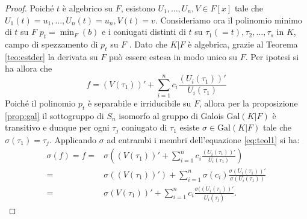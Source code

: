 \documentclass[10pt,oneside]{article}
\theoremstyle{definition}
\theoremstyle{plain}
\theoremstyle{definition}
\theoremstyle{plain}
\theoremstyle{plain}
\newcommand{\Gal}{\mathrm{Gal}}
\begin{document}
\begin{proof}
Poiché $t$ è algebrico su $F$, esistono $U_1,\dots,U_n, V \in F[x]$ tale che $U_1(t)=u_1,\dots,U_n(t)=u_n, V(t)=v.$ Consideriamo ora il polinomio minimo  di $t$ su $F$ $p_t= \min_F(b)$ e i coniugati distinti di $t$ su $\tau_1(=t), \tau_2, \dots , \tau_s$ in $K$, campo di spezzamento di $p_t$ su $F$ . Dato che $K|F$ è algebrica, grazie al Teorema \ref{teo:estder} la derivata su $F$  può essere estesa in modo unico  su $F$. Per ipotesi si ha allora che 
\begin{equation}\label{eq:teol1}
f = (V(\tau_1))'+\sum_{i=1}^n c_i \frac{(U_i(\tau_1))'}{U_i(\tau_1)} 
\end{equation}
Poiché il polinomio $p_t$ è separabile e irriducibile su $F$, allora per la proposizione \ref{prop:gal} il sottogruppo di $S_n$ isomorfo al gruppo di Galois $\Gal(K|F)$ è transitivo e dunque per ogni $\tau_j$ coniugato di $\tau_1$ esiste $\sigma \in \Gal(K|F)$ tale che $\sigma(\tau_1)=\tau_j$. Applicando $\sigma$ ad entrambi i membri dell'equazione \eqref{eq:teol1} si ha:
\[
\begin{split}
\sigma(f)= f=& \sigma \left( (V(\tau_1))'+\sum_{i=1}^n c_i \frac{(U_i(\tau_1))'}{U_i(\tau_1)}  \right) \\
=& \sigma((V(\tau_1))')+\sum_{i=1}^n\sigma(c_i)\frac{\sigma (U_i(\tau_1))'}{\sigma( U_i (\tau_1))}  \\
=& \sigma(V(\tau_1))'+\sum_{i=1}^nc_i\frac{\sigma ((U_i(\tau_1))'}{ U_i (\tau_j)}.
\end{split}
\]


\end{proof}
\end{document}
